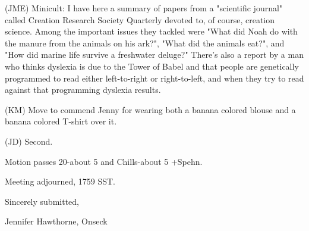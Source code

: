\documentclass[12pt]{article}
\begin{document}
(JME) Minicult: I have here a summary of papers from a "scientific journal" called Creation Research Society Quarterly devoted to, of course, creation science. Among the important issues they tackled were "What did Noah do with the manure from the animals on his ark?", "What did the animals eat?", and "How did marine life survive a freshwater deluge?" There's also a report by a man who thinks dyslexia is due to the Tower of Babel and that people are genetically programmed to read either left-to-right or right-to-left, and when they try to read against that programming dyslexia results.

(KM) Move to commend Jenny for wearing both a banana colored blouse and a banana colored T-shirt over it.

(JD) Second.

Motion passes 20-about 5 and Chills-about 5 +Spehn.

\vspace{12pt}

\noindent
Meeting adjourned, 1759 SST.

\vspace{18pt}

\centerline{Sincerely submitted,}
\centerline{Jennifer Hawthorne, Onseck}
\end{document}
